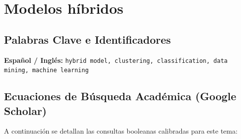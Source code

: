 \section{Modelos híbridos}
\label{sec:05_modelos_hibridos}


\subsection{Palabras Clave e Identificadores}
\textbf{Español / Inglés:} \texttt{hybrid model, clustering, classification, data mining, machine learning}


\subsection{Ecuaciones de Búsqueda Académica (Google Scholar)}
A continuación se detallan las consultas booleanas calibradas para este tema:

